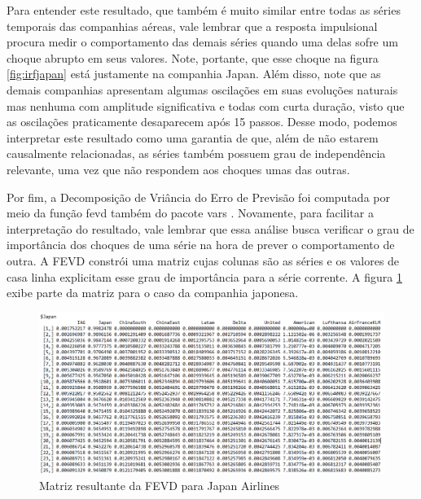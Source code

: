 \documentclass[12pt]{article}
\begin{document}
	Para entender este resultado, que também é muito similar entre todas as séries temporais das companhias aéreas, vale lembrar que a resposta impulsional procura medir o comportamento das demais séries quando uma delas sofre um choque abrupto em seus valores. Note, portante, que esse choque na figura \ref{fig:irfjapan} está justamente na companhia Japan. Além disso, note que as demais companhias apresentam algumas oscilações em suas evoluções naturais mas nenhuma com amplitude significativa e todas com curta duração, visto que as oscilações praticamente desaparecem após 15 passos. Desse modo, podemos interpretar este resultado como uma garantia de que, além de não estarem causalmente relacionadas, as séries também possuem grau de independência relevante, uma vez que não respondem aos choques umas das outras.
	
	Por fim, a Decomposição de Vriância do Erro de Previsão foi computada por meio da função \textrm{fevd} também do pacote \textrm{vars} \cite{CRANR}. Novamente, para facilitar a interpretação do resultado, vale lembrar que essa análise busca verificar o grau de importância dos choques de uma série na hora de prever o comportamento de outra. A FEVD constrói uma matriz cujas colunas são as séries e os valores de casa linha explicitam esse grau de importância para a série corrente. A figura \ref{fig:fevdjapan} exibe parte da matriz para o caso da companhia japonesa.
	
	\begin{figure}[H]
		\centering
		\includegraphics[width=1.0\linewidth]{Imagens/FEVD_Japan}
		\caption{Matriz resultante da FEVD para Japan Airlines}
		\label{fig:fevdjapan}
	\end{figure}
	
\end{document}
